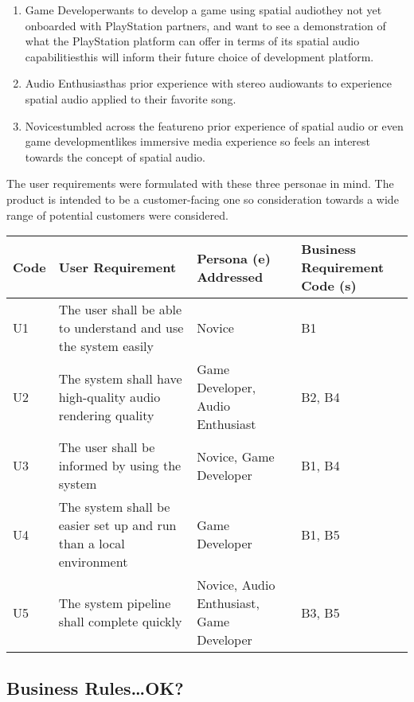 \begin{enumerate}
    \item Game Developer\textemdash wants to develop a game using spatial audio\textemdash they not yet onboarded with PlayStation partners, and want to see a demonstration of what the PlayStation platform can offer in terms of its spatial audio capabilities\textemdash this will inform their future choice of development platform.
    \item Audio Enthusiast\textemdash has prior experience with stereo audio\textemdash wants to experience spatial audio applied to their favorite song.
    \item Novice\textemdash stumbled across the feature\textemdash no prior experience of spatial audio or even game development\textemdash likes immersive media experience so feels an interest towards the concept of spatial audio.
\end{enumerate}

The user requirements were formulated with these three personae in mind.
The product is intended to be a customer-facing one so consideration towards a wide range of potential customers were considered.

\begin{tabularx}{\textwidth}{szzs}
    \caption{User Requirements}\label{tab:user-requirements}\\
    \toprule
    \textbf{Code} & \textbf{User Requirement} & \textbf{Persona (e) Addressed} & \textbf{Business Requirement Code (s)} \\\midrule
    U1 & The user shall be able to understand and use the system easily & Novice & B1 \\\midrule
    U2 & The system shall have high-quality audio rendering quality & Game Developer, Audio Enthusiast & B2, B4 \\\midrule
    U3 & The user shall be informed by using the system & Novice, Game Developer & B1, B4 \\\midrule
    U4 & The system shall be easier set up and run than a local environment & Game Developer & B1, B5 \\\midrule
    U5 & The system pipeline shall complete quickly & Novice, Audio Enthusiast, Game Developer & B3, B5 \\\bottomrule
\end{tabularx}

\subsection{Business Rules\ldots OK?}\label{subsec:business-rules-ok}


